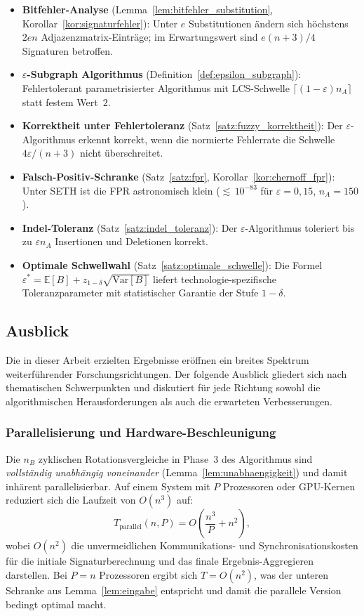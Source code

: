 ﻿\documentclass[a4paper,12pt]{article}
\theoremstyle{definition}
\begin{document}
\begin{itemize}
	Zuordnung aller Reads zu ihren Ursprungsorganismen.
	\item \textbf{Bitfehler-Analyse}
	(Lemma~\ref{lem:bitfehler_substitution},
	Korollar~\ref{kor:signaturfehler}):
	Unter $e$ Substitutionen \"{a}ndern sich h\"{o}chstens $2en$
	Adjazenzmatrix-Eintr\"{a}ge; im Erwartungswert sind
	$e(n+3)/4$ Signaturen betroffen.
	\item \textbf{$\varepsilon$-Subgraph Algorithmus}
	(Definition~\ref{def:epsilon_subgraph}):
	Fehlertolerant parametrisierter Algorithmus mit LCS-Schwelle
	$\lceil(1-\varepsilon)n_A\rceil$ statt festem Wert~$2$.
	\item \textbf{Korrektheit unter Fehlertoleranz}
	(Satz~\ref{satz:fuzzy_korrektheit}):
	Der $\varepsilon$-Algorithmus erkennt korrekt, wenn die normierte
	Fehlerrate die Schwelle $4\varepsilon/(n+3)$ nicht \"{u}berschreitet.
	\item \textbf{Falsch-Positiv-Schranke}
	(Satz~\ref{satz:fpr}, Korollar~\ref{kor:chernoff_fpr}):
	Unter SETH ist die FPR astronomisch klein (${\lesssim}\,10^{-83}$
	f\"{u}r $\varepsilon=0{,}15$, $n_A=150$).
	\item \textbf{Indel-Toleranz} (Satz~\ref{satz:indel_toleranz}):
	Der $\varepsilon$-Algorithmus toleriert bis zu $\varepsilon n_A$
	Insertionen und Deletionen korrekt.
	\item \textbf{Optimale Schwellwahl}
	(Satz~\ref{satz:optimale_schwelle}):
	Die Formel $\varepsilon^* = \mathbb{E}[B] + z_{1-\delta}\sqrt{\mathrm{Var}[B]}$
	liefert technologie-spezifische Toleranzparameter mit statistischer
	Garantie der Stufe $1-\delta$.
\end{itemize}

\subsection{Ausblick}
\label{subsec:ausblick}

Die in dieser Arbeit erzielten Ergebnisse eröffnen ein breites Spektrum
weiterführender Forschungsrichtungen. Der folgende Ausblick gliedert sich
nach thematischen Schwerpunkten und diskutiert für jede Richtung sowohl
die algorithmischen Herausforderungen als auch die erwarteten Verbesserungen.

\subsubsection{Parallelisierung und Hardware-Beschleunigung}

Die $n_B$ zyklischen Rotationsvergleiche in Phase~3 des Algorithmus sind
\textit{vollständig unabhängig voneinander} (Lemma~\ref{lem:unabhaengigkeit})
und damit inhärent parallelisierbar. Auf einem System mit $P$ Prozessoren
oder GPU-Kernen reduziert sich die Laufzeit von $O(n^3)$ auf:
\[
T_{\text{parallel}}(n, P) = O\!\left(\frac{n^3}{P} + n^2\right),
\]
wobei $O(n^2)$ die unvermeidlichen Kommunikations- und Synchronisationskosten
für die initiale Signaturberechnung und das finale Ergebnis-Aggregieren darstellen.
Bei $P = n$ Prozessoren ergibt sich $T = O(n^2)$, was der unteren Schranke aus
Lemma~\ref{lem:eingabe} entspricht und damit die parallele Version bedingt optimal
macht.
\end{document}
